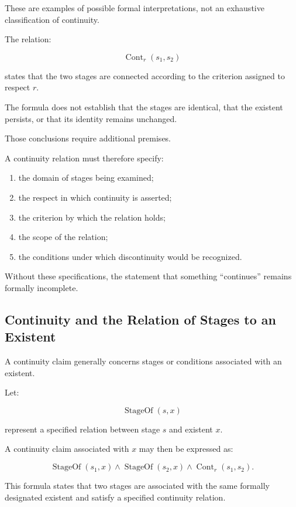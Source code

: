 These are examples of possible formal
interpretations, not an exhaustive
classification of continuity.

The relation:

\[
    \operatorname{Cont}_{r}(s_1,s_2)
\]

states that the two stages are connected
according to the criterion assigned to
respect \(r\).

The formula does not establish that the
stages are identical, that the existent
persists, or that its identity remains
unchanged.

Those conclusions require additional
premises.

A continuity relation must therefore
specify:

\begin{enumerate}
    \item the domain of stages being examined;
    \item the respect in which continuity
    is asserted;
    \item the criterion by which the
    relation holds;
    \item the scope of the relation;
    \item the conditions under which
    discontinuity would be recognized.
\end{enumerate}

Without these specifications, the
statement that something ``continues''
remains formally incomplete.

\subsection{Continuity and the Relation of Stages to an Existent}

A continuity claim generally concerns
stages or conditions associated with
an existent.

Let:

\[
    \operatorname{StageOf}(s,x)
\]

represent a specified relation between
stage \(s\) and existent \(x\).

A continuity claim associated with
\(x\) may then be expressed as:

\[
    \operatorname{StageOf}(s_1,x)
    \land
    \operatorname{StageOf}(s_2,x)
    \land
    \operatorname{Cont}_{r}(s_1,s_2).
\]

This formula states that two stages
are associated with the same formally
designated existent and satisfy a
specified continuity relation.

